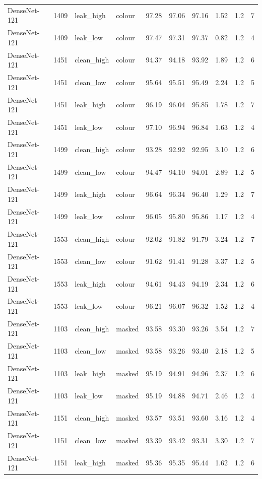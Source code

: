 {\begin{longtable}{lrllrrrrrr}
DenseNet-121 & 1409 & leak\_high & colour & 97.28 & 97.06 & 97.16 & 1.52 & 1.2 & 7 \\
DenseNet-121 & 1409 & leak\_low & colour & 97.47 & 97.31 & 97.37 & 0.82 & 1.2 & 4 \\
DenseNet-121 & 1451 & clean\_high & colour & 94.37 & 94.18 & 93.92 & 1.89 & 1.2 & 6 \\
DenseNet-121 & 1451 & clean\_low & colour & 95.64 & 95.51 & 95.49 & 2.24 & 1.2 & 5 \\
DenseNet-121 & 1451 & leak\_high & colour & 96.19 & 96.04 & 95.85 & 1.78 & 1.2 & 7 \\
DenseNet-121 & 1451 & leak\_low & colour & 97.10 & 96.94 & 96.84 & 1.63 & 1.2 & 4 \\
DenseNet-121 & 1499 & clean\_high & colour & 93.28 & 92.92 & 92.95 & 3.10 & 1.2 & 6 \\
DenseNet-121 & 1499 & clean\_low & colour & 94.47 & 94.10 & 94.01 & 2.89 & 1.2 & 5 \\
DenseNet-121 & 1499 & leak\_high & colour & 96.64 & 96.34 & 96.40 & 1.29 & 1.2 & 7 \\
DenseNet-121 & 1499 & leak\_low & colour & 96.05 & 95.80 & 95.86 & 1.17 & 1.2 & 4 \\
DenseNet-121 & 1553 & clean\_high & colour & 92.02 & 91.82 & 91.79 & 3.24 & 1.2 & 7 \\
DenseNet-121 & 1553 & clean\_low & colour & 91.62 & 91.41 & 91.28 & 3.37 & 1.2 & 5 \\
DenseNet-121 & 1553 & leak\_high & colour & 94.61 & 94.43 & 94.19 & 2.34 & 1.2 & 6 \\
DenseNet-121 & 1553 & leak\_low & colour & 96.21 & 96.07 & 96.32 & 1.52 & 1.2 & 4 \\
DenseNet-121 & 1103 & clean\_high & masked & 93.58 & 93.30 & 93.26 & 3.54 & 1.2 & 7 \\
DenseNet-121 & 1103 & clean\_low & masked & 93.58 & 93.26 & 93.40 & 2.18 & 1.2 & 5 \\
DenseNet-121 & 1103 & leak\_high & masked & 95.19 & 94.91 & 94.96 & 2.37 & 1.2 & 6 \\
DenseNet-121 & 1103 & leak\_low & masked & 95.19 & 94.88 & 94.71 & 2.46 & 1.2 & 4 \\
DenseNet-121 & 1151 & clean\_high & masked & 93.57 & 93.51 & 93.60 & 3.16 & 1.2 & 4 \\
DenseNet-121 & 1151 & clean\_low & masked & 93.39 & 93.42 & 93.31 & 3.30 & 1.2 & 7 \\
DenseNet-121 & 1151 & leak\_high & masked & 95.36 & 95.35 & 95.44 & 1.62 & 1.2 & 6 \\

\end{longtable}}
